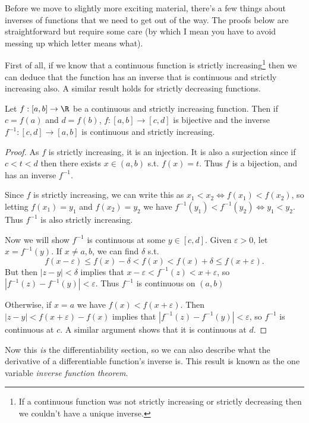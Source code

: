 Before we move to slightly more exciting material, there's a few things about inverses of functions that we need to get out of the way. The proofs below are straightforward but require some care (by which I mean you have to avoid messing up which letter means what).

First of all, if we know that a continuous function is strictly increasing\footnote{If a continuous function was not strictly increasing or strictly decreasing then we couldn't have a unique inverse.} then we can deduce that the function has an inverse that is continuous and strictly increasing also. A similar result holds for strictly decreasing functions.

\begin{theorem}
	Let $f:[a, b] \rightarrow \R$ be a continuous and strictly increasing function. Then if $c = f(a)$ and $d = f(b)$, $f:[a, b] \rightarrow [c, d]$ is bijective and the inverse $f^{-1}: [c, d] \rightarrow [a, b]$ is continuous and strictly increasing.
\end{theorem}
\begin{proof}
	As $f$ is strictly increasing, it is an injection. It is also a surjection since if $c < t < d$ then there exists $x \in (a, b)$ s.t. $f(x) = t$. Thus $f$ is a bijection, and has an inverse $f^{-1}$.

	Since $f$ is strictly increasing, we can write this as $x_1 < x_2 \iff f(x_1) < f(x_2)$, so letting $f(x_1) = y_1$ and $f(x_2) = y_2$ we have 
	$f^{-1}(y_1) < f^{-1}(y_2) \iff y_1 < y_2$. Thus $f^{-1}$ is also strictly increasing.
	
	Now we will show $f^{-1}$ is continuous at some $y \in [c, d]$.
	Given $\varepsilon > 0$, 
	let $x = f^{-1}(y)$. If $x \neq a, b$, we can find $\delta$ s.t.
	$$
		f(x - \varepsilon) \leq f(x) - \delta < f(x) < f(x) + \delta \leq f(x + \varepsilon).
	$$
	But then $|z - y| < \delta$ implies that $x - \varepsilon < f^{-1}(z) < x + \varepsilon$, so $|f^{-1}(z) - f^{-1}(y)| < \varepsilon$.
	Thus $f^{-1}$ is continuous on $(a, b)$

	Otherwise, if $x = a$ we have $f(x) < f(x + \varepsilon)$. Then $|z - y| < f(x + \varepsilon) - f(x)$ implies that $|f^{-1}(z) - f^{-1}(y)| < \varepsilon$, so $f^{-1}$ is continuous at $c$. A similar argument shows that it is continuous at $d$.
\end{proof}

Now this \emph{is} the differentiability section, so we can also describe what the derivative of a differentiable function's inverse is. This result is known as the one variable \emph{inverse function theorem}.

